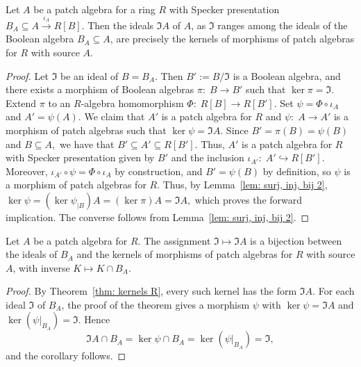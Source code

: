 \documentclass[11pt]{amsart}
\begin{document}
\begin{theorem}\label{thm: kernels R}
    Let $A$ be a patch algebra for a ring $R$ with Specker presentation $B_A \subseteq A \xrightarrow{\iota_A} R[B]$. 
    Then the ideals ${\mathfrak I}A$ of $A$, as $\mathfrak I$ ranges among the ideals of the Boolean algebra
    $B_A\subseteq A$, are precisely the kernels of morphisms of patch algebras for $R$ with source $A$. 
\end{theorem}

\begin{proof}
 Let $\mathfrak I$ be an ideal of $B=B_A$. Then $B' := B/\mathfrak I$ is a Boolean algebra, and there exists a morphism of Boolean algebras $\pi \colon\; B \to B'$
such that $\ker \pi = \mathfrak I.$ Extend $\pi$ to an $R$-algebra homomorphism $ \Phi \colon\; R[B] \to R[B']$. {Set $\psi=\Phi\circ\iota_A$ and $A'=\psi(A)$.}
We claim that $A'$ is a patch algebra for $R$ and $\psi \colon\; A \to 
A'$ is a morphism of patch algebras such that $\ker \psi = {\mathfrak I}A.$
Since $B' = \pi(B) = \psi(B)$ and $B \subseteq A,$ we have that $B' \subseteq A'\subseteq R[B'].$ Thus, $A'$ is a patch algebra for $R$ with Specker presentation {given by $B'$ and the inclusion $\iota_{A'}\colon\; A'\hookrightarrow R[B']$}. 
Moreover, {$\iota_{A'}\circ\psi=\Phi\circ\iota_A$} by construction, and $B' = \psi(B)$ by definition, so $\psi$ is a morphism of patch algebras for $R$.
Thus, by Lemma~\ref{lem: surj, inj, bij 2}, $\ker \psi = (\ker \psi_{|B})A = (\ker \pi)A = {\mathfrak I}A,$ which proves the forward implication. The converse follows from Lemma~\ref{lem: surj, inj, bij 2}.
\end{proof}


\begin{corollary}\label{cor: kernel correspondence}
Let $A$ be a patch algebra for $R$. The assignment $\mathfrak I\mapsto\mathfrak I A$ is a bijection between the ideals of $B_A$ and the kernels of morphisms of patch algebras for $R$ with source $A$, with inverse $K\mapsto K\cap B_A$.
\end{corollary}

\begin{proof}
By Theorem~\ref{thm: kernels R}, every such kernel has the form $\mathfrak I A$. For each ideal $\mathfrak I$ of $B_A$, the  proof of the theorem gives a morphism $\psi$ with $\ker\psi=\mathfrak I A$ and $\ker(\psi|_{B_A})=\mathfrak I$. Hence $$ \mathfrak I A\cap B_A =\ker\psi\cap B_A =\ker(\psi|_{B_A}) =\mathfrak I, $$
and the corollary follows.
\end{proof}
\end{document}
